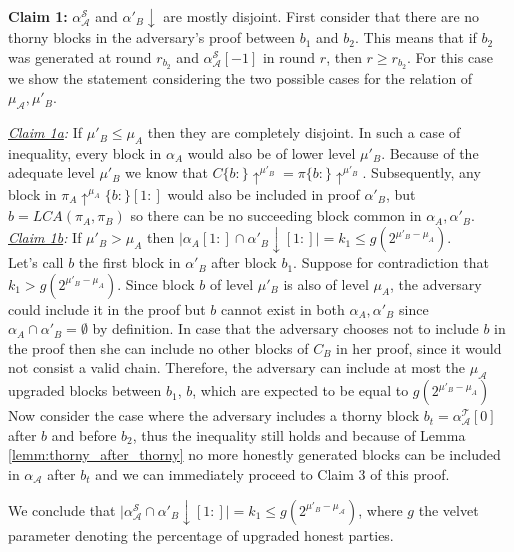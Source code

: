 \textbf{Claim 1:} $\alpha^{\mathcal{S}}_\mathcal{A}$ and
$\alpha'_B \downarrow$ are mostly disjoint. First consider that there are no thorny blocks in the adversary's proof between $b_1$ and $b_2$. This means that if $b_2$ was generated at round $r_{b_2}$ and $\alpha^{\mathcal{S}}_\mathcal{A}[-1]$ in round $r$, then $r \geq r_{b_2}$. For this case we show the statement considering the two possible cases for the relation of $\mu_\mathcal{A}, \mu'_B$.

\textit{\underline{Claim 1a}:} If $\mu'_B \leq \mu_A$ then they are completely disjoint. In such a case of inequality, every block in $\alpha_A$ would also be
of lower level $\mu'_B$. Because of the adequate level $\mu'_B$ we know that $C\{b:\}\uparrow^{\mu'_B} = \pi\{b:\}\uparrow^{\mu'_B}$\cite{NIPoPoWs}. Subsequently, any block in $\pi_A\uparrow^{\mu_A}\{b:\}[1:]$ would also be included in proof $\alpha'_B$, but $b=LCA(\pi_A, \pi_B)$ so there can be no succeeding block common in $\alpha_A, \alpha'_B$. \\

\textit{\underline{Claim 1b}:} If  $\mu'_B > \mu_A$ then $\vert \alpha_A[1:]  \cap \alpha'_B\downarrow[1:] \vert = k_1 \leq g(2^{\mu'_B - \mu_A})$.\\
Let's call $b$ the first block in $\alpha'_B$ after block $b_1$.
Suppose for contradiction that $k_1 > g(2^{\mu'_B - \mu_A})$.  Since block $b$ of level $\mu'_B$ is also of level $\mu_A$, the adversary could include it in the proof but $b$ cannot exist in both $\alpha_A, \alpha'_B$ since $\alpha_A \cap \alpha'_B = \emptyset$ by definition. In case that the adversary chooses not to include $b$ in the proof then she can include no other blocks of $C_B$ in her proof, since it would not consist a valid chain. Therefore, the adversary can include at most the $\mu_\mathcal{A}$ upgraded  blocks  between  $b_1$, $b$, which are expected to be equal to $g(2^{\mu'_B - \mu_A})$\\

Now consider the case where the adversary includes a thorny block $b_t = \alpha^{\mathcal{T}}_{\mathcal{A}}[0]$ after $b$ and before $b_2$, thus the inequality still
holds and because of Lemma \ref{lemm:thorny_after_thorny} no more honestly generated blocks can be included
in $\alpha_\mathcal{A}$ after $b_t$ and we can immediately proceed to Claim 3 of this proof.

We conclude that 
$\vert \alpha^{\mathcal{S}}_\mathcal{A} \cap \alpha'_B\downarrow[1:] \vert = k_{1} \leq g(2^{\mu'_B - \mu_\mathcal{A}})
$, where $g$ the velvet parameter denoting the percentage of upgraded honest parties. 

